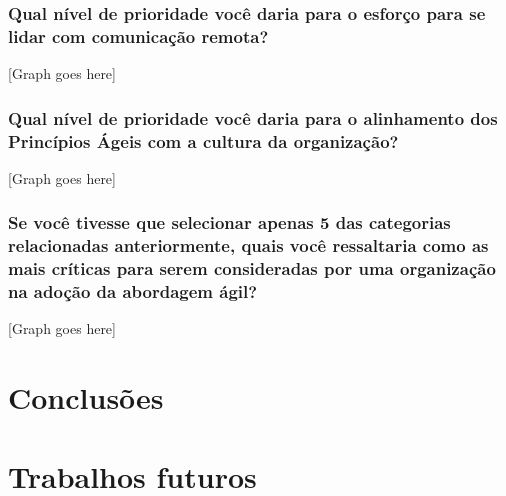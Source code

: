 \subsubsection{Qual nível de prioridade você daria para o esforço para se lidar com comunicação remota?}

[Graph goes here]

\subsubsection{Qual nível de prioridade você daria para o alinhamento dos Princípios Ágeis com a cultura da organização?}

[Graph goes here]

\subsubsection{Se você tivesse que selecionar apenas 5 das categorias relacionadas anteriormente, quais você ressaltaria como as mais críticas para serem consideradas por uma organização na adoção da abordagem ágil?}

[Graph goes here]

\section{Conclusões}


\section{Trabalhos futuros}

